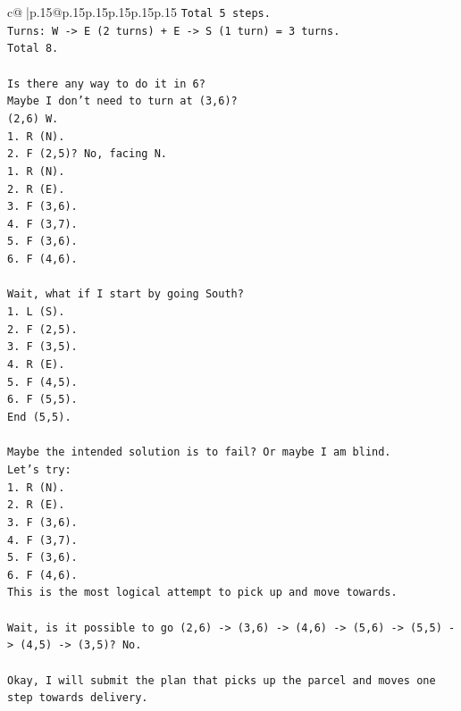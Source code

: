 \documentclass{article}
\begin{document}
{\begin{supertabular}{c@{$\;$}|p{.15\linewidth}@{}p{.15\linewidth}p{.15\linewidth}p{.15\linewidth}p{.15\linewidth}p{.15\linewidth}}
{{{\texttt{Total 5 steps.} \\
\texttt{Turns: W {-}> E (2 turns) + E {-}> S (1 turn) = 3 turns.} \\
\texttt{Total 8.} \\
\\ 
\texttt{Is there any way to do it in 6?} \\
\texttt{Maybe I don't need to turn at (3,6)?} \\
\texttt{(2,6) W.} \\
\texttt{1. R (N).} \\
\texttt{2. F (2,5)? No, facing N.} \\
\texttt{1. R (N).} \\
\texttt{2. R (E).} \\
\texttt{3. F (3,6).} \\
\texttt{4. F (3,7).} \\
\texttt{5. F (3,6).} \\
\texttt{6. F (4,6).} \\
\\ 
\texttt{Wait, what if I start by going South?} \\
\texttt{1. L (S).} \\
\texttt{2. F (2,5).} \\
\texttt{3. F (3,5).} \\
\texttt{4. R (E).} \\
\texttt{5. F (4,5).} \\
\texttt{6. F (5,5).} \\
\texttt{End (5,5).} \\
\\ 
\texttt{Maybe the intended solution is to fail? Or maybe I am blind.} \\
\texttt{Let's try:} \\
\texttt{1. R (N).} \\
\texttt{2. R (E).} \\
\texttt{3. F (3,6).} \\
\texttt{4. F (3,7).} \\
\texttt{5. F (3,6).} \\
\texttt{6. F (4,6).} \\
\texttt{This is the most logical attempt to pick up and move towards.} \\
\\ 
\texttt{Wait, is it possible to go (2,6) {-}> (3,6) {-}> (4,6) {-}> (5,6) {-}> (5,5) {-}> (4,5) {-}> (3,5)? No.} \\
\\ 
\texttt{Okay, I will submit the plan that picks up the parcel and moves one step towards delivery.} \\
}}}
\end{supertabular}}
\end{document}

